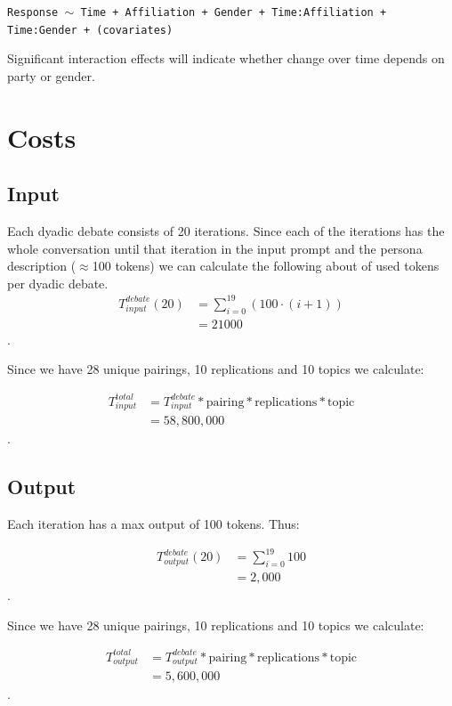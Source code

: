 \documentclass[12pt]{article}
\begin{document}
\begin{multicols}{2}
\texttt{Response $\sim$ Time + Affiliation + Gender + Time:Affiliation + Time:Gender + (covariates)}

Significant interaction effects will indicate whether change over time depends on party or gender.






\appendix




\section{Costs}

\subsection{Input}


Each dyadic debate consists of 20 iterations. Since each of the iterations has the whole conversation until that iteration in the input prompt and the persona description ($\approx$100 tokens) we can calculate the following about of used tokens per dyadic debate. 
\begin{align*}
    T^{debate}_{input}(20) &= \sum_{i=0}^{19} (100 \cdot (i+1)) \\ %
    &= 21000
\end{align*}.

Since we have 28 unique pairings, 10 replications and 10 topics we calculate:

\begin{align*}
    T^{total}_{input} &= T^{debate}_{input} * \text{pairing} *\text{replications} * \text{topic} \\
    &= 58{,}800{,}000
\end{align*}.

\subsection{Output}

Each iteration has a max output of 100 tokens. Thus:


\begin{align*}
    T^{debate}_{output}(20) &= \sum_{i=0}^{19}100 \\ %
    &= 2{,}000
\end{align*}.

Since we have 28 unique pairings, 10 replications and 10 topics we calculate:

\begin{align*}
    T^{total}_{output} &= T^{debate}_{output} * \text{pairing} *\text{replications} * \text{topic} \\
    &= 5,600,000
\end{align*}.
\end{multicols}
\end{document}
